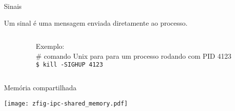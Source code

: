 \documentclass{beamer}
\begin{document}
\begin{frame}{Sinais}
  
  Um sinal é uma mensagem enviada diretamente ao processo.
  \vspace{1.5cm}

  \begin{columns}
     \begin{column}{.5\textwidth}

\end{column}

\begin{column}{.5\textwidth}
  \small
  Exemplo:\\
  \# comando {\sc Unix} para para um processo rodando com PID
    4123\\
    \bigskip
  {\tt \$ kill -SIGHUP 4123}

  

\end{column}      

\end{columns}

\end{frame}



\begin{frame}{Memória compartilhada}
  
  \begin{center}
    \texttt{[image: zfig-ipc-shared\_memory.pdf]}
  \end{center}

\end{frame}
\end{document}
